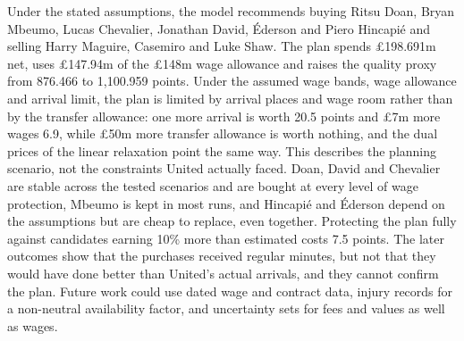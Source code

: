 Under the stated assumptions, the model recommends buying Ritsu Doan, Bryan Mbeumo, Lucas Chevalier, Jonathan David, Éderson and Piero Hincapié and selling Harry Maguire, Casemiro and Luke Shaw. The plan spends \pounds 198.691m net, uses \pounds 147.94m of the \pounds 148m wage allowance and raises the quality proxy from 876.466 to 1,100.959 points. Under the assumed wage bands, wage allowance and arrival limit, the plan is limited by arrival places and wage room rather than by the transfer allowance: one more arrival is worth 20.5 points and \pounds 7m more wages 6.9, while \pounds 50m more transfer allowance is worth nothing, and the dual prices of the linear relaxation point the same way. This describes the planning scenario, not the constraints United actually faced. Doan, David and Chevalier are stable across the tested scenarios and are bought at every level of wage protection, Mbeumo is kept in most runs, and Hincapié and Éderson depend on the assumptions but are cheap to replace, even together. Protecting the plan fully against candidates earning 10\% more than estimated costs 7.5 points. The later outcomes show that the purchases received regular minutes, but not that they would have done better than United's actual arrivals, and they cannot confirm the plan. Future work could use dated wage and contract data, injury records for a non-neutral availability factor, and uncertainty sets for fees and values as well as wages.
